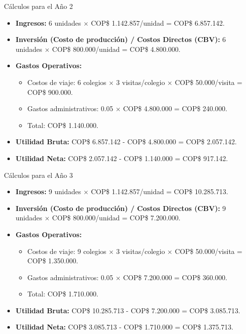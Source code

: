 \begin{frame}{Cálculos para el Año 2}
  \begin{itemize}
    \item \textbf{Ingresos:} 6 unidades $\times$ COP\$ 1.142.857/unidad =
      COP\$ 6.857.142.
    \item \textbf{Inversión (Costo de producción) / Costos Directos (CBV):}
      6 unidades $\times$ COP\$ 800.000/unidad = COP\$ 4.800.000.
    \item \textbf{Gastos Operativos:}
      \begin{itemize}
        \item Costos de viaje: 6 colegios $\times$ 3 visitas/colegio
          $\times$ COP\$ 50.000/visita = COP\$ 900.000.
        \item Gastos administrativos: 0.05 $\times$ COP\$ 4.800.000 =
          COP\$ 240.000.
        \item Total: COP\$ 1.140.000.
      \end{itemize}
    \item \textbf{Utilidad Bruta:} COP\$ 6.857.142 - COP\$ 4.800.000 = COP\$ 2.057.142.
    \item \textbf{Utilidad Neta:} COP\$ 2.057.142 - COP\$ 1.140.000 = COP\$ 917.142.
  \end{itemize}
\end{frame}

\begin{frame}{Cálculos para el Año 3}
  \begin{itemize}
    \item \textbf{Ingresos:} 9 unidades $\times$ COP\$ 1.142.857/unidad =
      COP\$ 10.285.713.
    \item \textbf{Inversión (Costo de producción) / Costos Directos (CBV):}
      9 unidades $\times$ COP\$ 800.000/unidad = COP\$ 7.200.000.
    \item \textbf{Gastos Operativos:}
      \begin{itemize}
        \item Costos de viaje: 9 colegios $\times$ 3 visitas/colegio
          $\times$ COP\$ 50.000/visita = COP\$ 1.350.000.
        \item Gastos administrativos: 0.05 $\times$ COP\$ 7.200.000 =
          COP\$ 360.000.
        \item Total: COP\$ 1.710.000.
      \end{itemize}
    \item \textbf{Utilidad Bruta:} COP\$ 10.285.713 - COP\$ 7.200.000 = COP\$ 3.085.713.
    \item \textbf{Utilidad Neta:} COP\$ 3.085.713 - COP\$ 1.710.000 = COP\$ 1.375.713.
  \end{itemize}
\end{frame}

